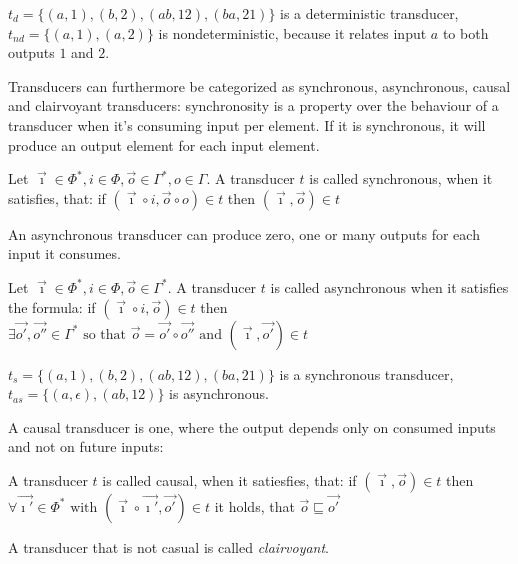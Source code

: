 \begin{exmp}[name = Deterministic and Nondeterministic Transducers]
  \(t_d = \{(a,1),(b,2),(ab,12),(ba,21)\}\) is a deterministic transducer, \(t_{nd} = \{(a,1),(a,2)\}\) is nondeterministic, because it relates input \(a\) to both outputs \(1\) and \(2\).
\end{exmp}

Transducers can furthermore be categorized as synchronous, asynchronous, causal and clairvoyant transducers:
synchronosity is a property over the behaviour of a transducer when it's consuming input per element.
If it is synchronous, it will produce an output element for each input element.

\begin{definition}[name = Synchronous Transducer]\label{def:synchronous_transducer}
Let \(\vec{\imath} \in \Phi^*, i \in \Phi, \vec{o} \in \Gamma^*, o \in \Gamma\).
  A transducer \(t\) is called synchronous, when it satisfies, that:
  if \( (\vec{\imath}\circ i,\vec{o}\circ o) \in t\)
  then \( (\vec{\imath}, \vec{o}) \in t \)
\end{definition}

An asynchronous transducer can produce zero, one or many outputs for each input it consumes.

\begin{definition}[name = Asynchronous Transducer]\label{def:asynchronous_transducer}
  Let \(\vec{\imath}\in \Phi^*, i \in \Phi,\vec{o} \in \Gamma^*\).
  A transducer \(t\) is called asynchronous when it satisfies the formula:
  if \((\vec{\imath}\circ i, \vec{o}) \in t \)
  then \(\exists \vec{o'},\vec{o''} \in \Gamma^*\text{ so that } \vec{o} = \vec{o'}\circ\vec{o''} \text{ and } (\vec{\imath},\vec{o'}) \in t \)
\end{definition}

\begin{exmp}[name = Synchronous and Asynchronous Transducers]
  \(t_s = \{(a,1),(b,2),(ab,12),(ba,21)\}\) is a synchronous transducer, \(t_{as} = \{(a,\epsilon),(ab,12)\}\) is asynchronous.
\end{exmp}

A causal transducer is one, where the output depends only on consumed inputs and not on future inputs:

\begin{definition}[name = Causal and Clairvoyant Transducers]\label{def:causal_transducer}
  A transducer \(t\) is called causal, when it satiesfies, that:
  if \((\vec{\imath},\vec{o}) \in t \)
  then \( \forall \vec{\imath'} \in \Phi^* \text{ with } (\vec{\imath} \circ \vec{\imath'}, \vec{o'}) \in t \)
  it holds, that \( \vec{o} \sqsubseteq \vec{o'} \)

  A transducer that is not casual is called \emph{clairvoyant}.
\end{definition}


